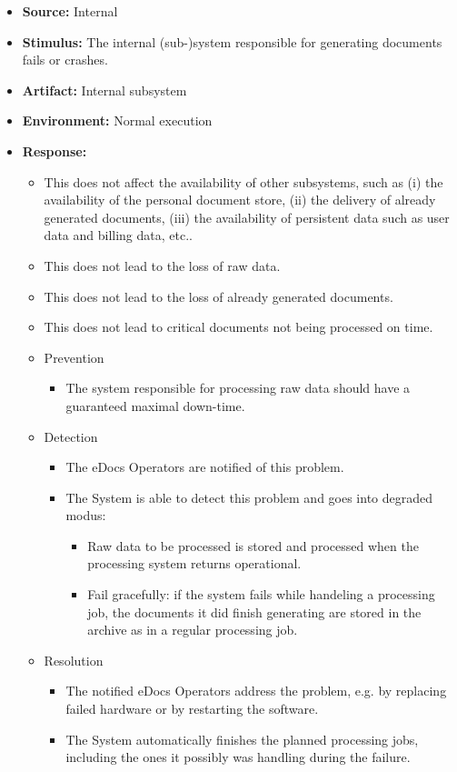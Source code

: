 \documentclass[a4paper,10pt]{article}
\begin{document}
\begin{itemize}
    \item \textbf{Source:} Internal
    \item \textbf{Stimulus:} The internal (sub-)system responsible for generating documents fails or crashes.

    \item \textbf{Artifact:} Internal subsystem
    \item \textbf{Environment:} Normal execution
    \item \textbf{Response:}
        \begin{itemize}
        	\item This does not affect the availability of other subsystems, such as (i) the availability of the personal document store, (ii) the delivery of already generated documents, (iii) the availability of persistent data such as user data and billing data, etc..
			\item This does not lead to the loss of raw data.
			\item This does not lead to the loss of already generated documents.
			\item This does not lead to critical documents not being processed on time.
            \item Prevention
				\begin{itemize}
				\item The system responsible for processing raw data should have a guaranteed maximal down-time.
				\end{itemize}
           	 \item Detection
				\begin{itemize}
					\item The eDocs Operators are notified of this problem.
					\item The System is able to detect this problem and goes into degraded modus:
				\begin{itemize}
				\item Raw data to be processed is stored and processed when the processing system returns operational.
				\item Fail gracefully: if the system fails while handeling a processing job, the documents it did finish generating are stored in the archive as in a regular processing job.
				\end{itemize}
		\end{itemize}
            \item Resolution
		\begin{itemize}
			\item The notified eDocs Operators address the problem, e.g. by replacing failed hardware or by restarting the software.
			\item The System automatically finishes the planned processing jobs, including the ones it possibly was handling during the failure.
		\end{itemize}
        \end{itemize}


\end{itemize}
\end{document}
